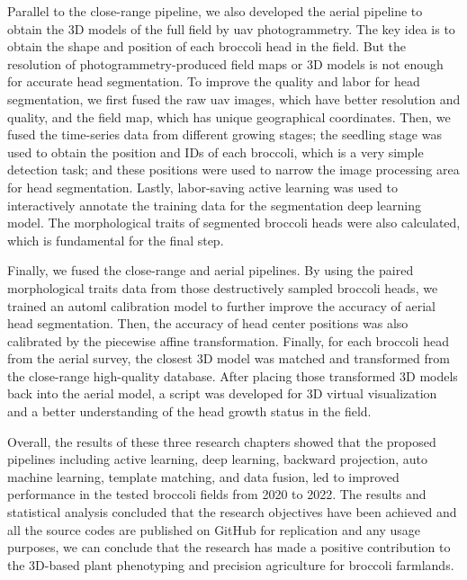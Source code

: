 Parallel to the close-range pipeline, we also developed the aerial pipeline to obtain the 3D models of the full field by \gls{uav} photogrammetry. The key idea is to obtain the shape and position of each broccoli head in the field. But the resolution of photogrammetry-produced field maps or 3D models is not enough for accurate head segmentation. To improve the quality and labor for head segmentation, we first fused the raw \gls{uav} images, which have better resolution and quality, and the field map, which has unique geographical coordinates. Then, we fused the time-series data from different growing stages; the seedling stage was used to obtain the position and IDs of each broccoli, which is a very simple detection task; and these positions were used to narrow the image processing area for head segmentation. Lastly, labor-saving active learning was used to interactively annotate the training data for the segmentation deep learning model. The morphological traits of segmented broccoli heads were also calculated, which is fundamental for the final step.

Finally, we fused the close-range and aerial pipelines. By using the paired morphological traits data from those destructively sampled broccoli heads, we trained an \gls{automl} calibration model to further improve the accuracy of aerial head segmentation. Then, the accuracy of head center positions was also calibrated by the piecewise affine transformation. Finally, for each broccoli head from the aerial survey, the closest 3D model was matched and transformed from the close-range high-quality database. After placing those transformed 3D models back into the aerial model, a script was developed for 3D virtual visualization and a better understanding of the head growth status in the field.

Overall, the results of these three research chapters showed that the proposed pipelines including active learning, deep learning, backward projection, auto machine learning, template matching, and data fusion, led to improved performance in the tested broccoli fields from 2020 to 2022. The results and statistical analysis concluded that the research objectives have been achieved and all the source codes are published on GitHub for replication and any usage purposes, we can conclude that the research has made a positive contribution to the 3D-based plant phenotyping and precision agriculture for broccoli farmlands.

